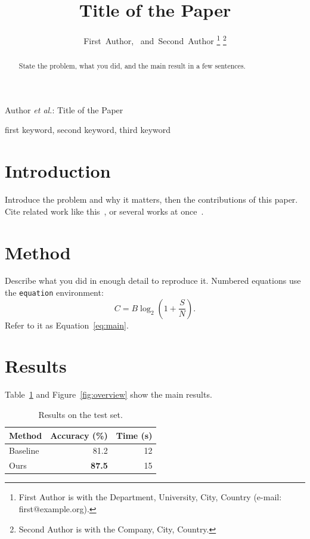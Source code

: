 \documentclass[journal,comsoc]{IEEEtran}
\begin{document}
\title{Title of the Paper}

\author{First~Author,~
        and~Second~Author%
\thanks{First Author is with the Department, University, City, Country (e-mail: first@example.org).}%
\thanks{Second Author is with the Company, City, Country.}}

%
{Author \MakeLowercase{\textit{et al.}}: Title of the Paper}

\maketitle

\begin{abstract}
State the problem, what you did, and the main result in a few sentences.
\end{abstract}

\begin{IEEEkeywords}
first keyword, second keyword, third keyword
\end{IEEEkeywords}

\section{Introduction}
\label{sec:intro}
Introduce the problem and why it matters, then the contributions of this
paper. Cite related work like this~\cite{shannon1948}, or several works at
once~\cite{shannon1948,kalman1960}.

\section{Method}
\label{sec:method}
Describe what you did in enough detail to reproduce it. Numbered equations use
the \texttt{equation} environment:
\begin{equation}
  \label{eq:main}
  C = B \log_2\left(1 + \frac{S}{N}\right).
\end{equation}
Refer to it as Equation~\eqref{eq:main}.

\section{Results}
\label{sec:results}
Table~\ref{tab:results} and Figure~\ref{fig:overview} show the main results.

\begin{table}[htbp]
  \centering
  \caption{Results on the test set.}
  \label{tab:results}
  \begin{tabular}{lrr}
    \toprule
    Method & Accuracy (\%) & Time (s) \\
    \midrule
    Baseline & 81.2 & 12 \\
    Ours & \textbf{87.5} & 15 \\
    \bottomrule
  \end{tabular}
\end{table}
\end{document}
